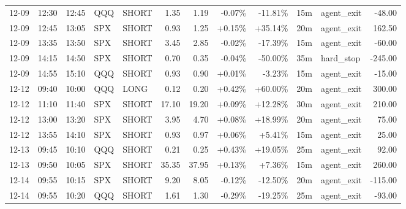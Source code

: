 \documentclass[11pt,a4paper]{article}
\begin{document}
\begin{center}
\begin{longtable}{>{\color{txtmain}}l l l l l r r r r r >{\color{txtmain}}l r}
12-09 & 12:30 & 12:45 & QQQ & SHORT & 1.35 & 1.19 & \textcolor{lossred}{-0.07\%} & \textcolor{lossred}{-11.81\%} & 15m & agent\_exit & \textcolor{lossred}{-48.00} \\
12-09 & 12:45 & 13:05 & SPX & SHORT & 0.93 & 1.25 & \textcolor{wingreen}{+0.15\%} & \textcolor{wingreen}{+35.14\%} & 20m & agent\_exit & \textcolor{wingreen}{162.50} \\
12-09 & 13:35 & 13:50 & SPX & SHORT & 3.45 & 2.85 & \textcolor{lossred}{-0.02\%} & \textcolor{lossred}{-17.39\%} & 15m & agent\_exit & \textcolor{lossred}{-60.00} \\
12-09 & 14:15 & 14:50 & SPX & SHORT & 0.70 & 0.35 & \textcolor{lossred}{-0.04\%} & \textcolor{lossred}{-50.00\%} & 35m & hard\_stop & \textcolor{lossred}{-245.00} \\
12-09 & 14:55 & 15:10 & QQQ & SHORT & 0.93 & 0.90 & \textcolor{wingreen}{+0.01\%} & \textcolor{lossred}{-3.23\%} & 15m & agent\_exit & \textcolor{lossred}{-15.00} \\
12-12 & 09:40 & 10:00 & QQQ & LONG & 0.12 & 0.20 & \textcolor{wingreen}{+0.42\%} & \textcolor{wingreen}{+60.00\%} & 20m & agent\_exit & \textcolor{wingreen}{300.00} \\
12-12 & 11:10 & 11:40 & SPX & SHORT & 17.10 & 19.20 & \textcolor{wingreen}{+0.09\%} & \textcolor{wingreen}{+12.28\%} & 30m & agent\_exit & \textcolor{wingreen}{210.00} \\
12-12 & 13:00 & 13:20 & SPX & SHORT & 3.95 & 4.70 & \textcolor{wingreen}{+0.08\%} & \textcolor{wingreen}{+18.99\%} & 20m & agent\_exit & \textcolor{wingreen}{75.00} \\
12-12 & 13:55 & 14:10 & SPX & SHORT & 0.93 & 0.97 & \textcolor{wingreen}{+0.06\%} & \textcolor{wingreen}{+5.41\%} & 15m & agent\_exit & \textcolor{wingreen}{25.00} \\
12-13 & 09:45 & 10:10 & QQQ & SHORT & 0.21 & 0.25 & \textcolor{wingreen}{+0.43\%} & \textcolor{wingreen}{+19.05\%} & 25m & agent\_exit & \textcolor{wingreen}{92.00} \\
12-13 & 09:50 & 10:05 & SPX & SHORT & 35.35 & 37.95 & \textcolor{wingreen}{+0.13\%} & \textcolor{wingreen}{+7.36\%} & 15m & agent\_exit & \textcolor{wingreen}{260.00} \\
12-14 & 09:55 & 10:15 & SPX & SHORT & 9.20 & 8.05 & \textcolor{lossred}{-0.12\%} & \textcolor{lossred}{-12.50\%} & 20m & agent\_exit & \textcolor{lossred}{-115.00} \\
12-14 & 09:55 & 10:20 & QQQ & SHORT & 1.61 & 1.30 & \textcolor{lossred}{-0.29\%} & \textcolor{lossred}{-19.25\%} & 25m & agent\_exit & \textcolor{lossred}{-93.00} \\

\end{longtable}
\end{center}
\end{document}
